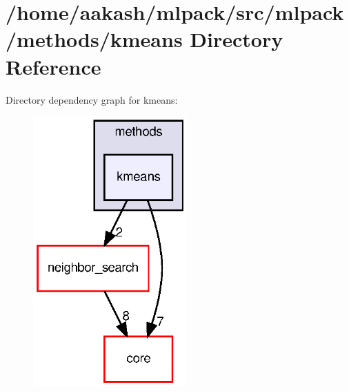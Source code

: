 \section{/home/aakash/mlpack/src/mlpack/methods/kmeans Directory Reference}
\label{dir_92fef07ccd725ea5b5efef3c585f82fc}
Directory dependency graph for kmeans\+:
\nopagebreak
\begin{figure}[H]
\begin{center}
\leavevmode
\includegraphics[width=167pt]{dir_92fef07ccd725ea5b5efef3c585f82fc_dep}
\end{center}
\end{figure}
